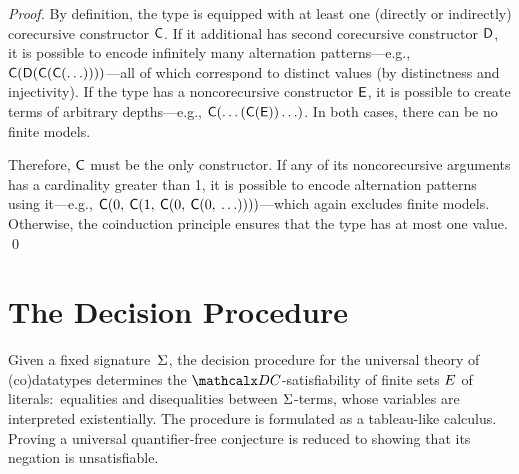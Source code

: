\begin{rep}
\begin{proof}
By definition, the type is equipped with at least one (directly or indirectly)
corecursive constructor $\textsf{C}$. If it additional has second
corecursive constructor $\textsf{D}$, it is possible to encode infinitely many
alternation patterns---e.g.,
$\textsf{C}(\textsf{D}(\textsf{C}(\textsf{C}(\ldots))))$---all of which correspond
to distinct values (by distinctness and injectivity). If the type has a
noncorecursive constructor $\textsf{E}$, it is possible to create terms of
arbitrary depths---e.g., $\textsf{C}(\ldots(\textsf{C}(\textsf{E}))\ldots)$. In
both cases, there can be no finite models.

Therefore, $\textsf{C}$ must be the only constructor.
If any of its noncorecursive arguments has a cardinality greater than 1,
it is possible to encode alternation patterns using it---e.g.,
$\textsf{C}(0,\: \textsf{C}(1,\: \textsf{C}(0,\: \textsf{C}(0,\: \ldots))))$---which
again excludes finite models. Otherwise, the coinduction principle ensures
that the type has at most one value.
\qed
\end{proof}
\end{rep}


\section{The Decision Procedure} %
\label{sec:the-decision-procedure}

Given a fixed signature~$\mathrm{\Sigma}$,
the decision procedure for the universal theory of (co)data\-types %
determines the
$\thD$-satisfiability of finite sets $E$ of literals:\ equalities
and disequalities between $\mathrm{\Sigma}$-terms,
whose variables are interpreted existentially.
The procedure is formulated as a tableau-like calculus.
Proving a universal quantifier-free conjecture is reduced to showing that
its negation is unsatisfiable.


